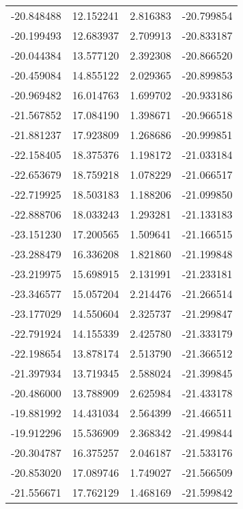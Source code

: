 \begin{tabular}{rrrr}
      -20.848488 &        12.152241 &    2.816383 & -20.799854 \\
      -20.199493 &        12.683937 &    2.709913 & -20.833187 \\
      -20.044384 &        13.577120 &    2.392308 & -20.866520 \\
      -20.459084 &        14.855122 &    2.029365 & -20.899853 \\
      -20.969482 &        16.014763 &    1.699702 & -20.933186 \\
      -21.567852 &        17.084190 &    1.398671 & -20.966518 \\
      -21.881237 &        17.923809 &    1.268686 & -20.999851 \\
      -22.158405 &        18.375376 &    1.198172 & -21.033184 \\
      -22.653679 &        18.759218 &    1.078229 & -21.066517 \\
      -22.719925 &        18.503183 &    1.188206 & -21.099850 \\
      -22.888706 &        18.033243 &    1.293281 & -21.133183 \\
      -23.151230 &        17.200565 &    1.509641 & -21.166515 \\
      -23.288479 &        16.336208 &    1.821860 & -21.199848 \\
      -23.219975 &        15.698915 &    2.131991 & -21.233181 \\
      -23.346577 &        15.057204 &    2.214476 & -21.266514 \\
      -23.177029 &        14.550604 &    2.325737 & -21.299847 \\
      -22.791924 &        14.155339 &    2.425780 & -21.333179 \\
      -22.198654 &        13.878174 &    2.513790 & -21.366512 \\
      -21.397934 &        13.719345 &    2.588024 & -21.399845 \\
      -20.486000 &        13.788909 &    2.625984 & -21.433178 \\
      -19.881992 &        14.431034 &    2.564399 & -21.466511 \\
      -19.912296 &        15.536909 &    2.368342 & -21.499844 \\
      -20.304787 &        16.375257 &    2.046187 & -21.533176 \\
      -20.853020 &        17.089746 &    1.749027 & -21.566509 \\
      -21.556671 &        17.762129 &    1.468169 & -21.599842 \\

\end{tabular}
